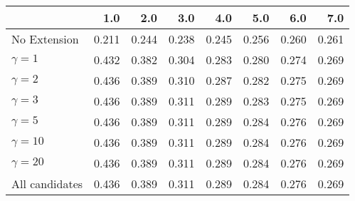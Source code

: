 \begin{tabular}{lrrrrrrr}
\toprule
{} &   1.0 &   2.0 &   3.0 &   4.0 &   5.0 &   6.0 &   7.0 \\
\midrule
No Extension   & 0.211 & 0.244 & 0.238 & 0.245 & 0.256 & 0.260 & 0.261 \\
$\gamma = 1$   & 0.432 & 0.382 & 0.304 & 0.283 & 0.280 & 0.274 & 0.269 \\
$\gamma = 2$   & 0.436 & 0.389 & 0.310 & 0.287 & 0.282 & 0.275 & 0.269 \\
$\gamma = 3$   & 0.436 & 0.389 & 0.311 & 0.289 & 0.283 & 0.275 & 0.269 \\
$\gamma = 5$   & 0.436 & 0.389 & 0.311 & 0.289 & 0.284 & 0.276 & 0.269 \\
$\gamma = 10$  & 0.436 & 0.389 & 0.311 & 0.289 & 0.284 & 0.276 & 0.269 \\
$\gamma = 20$  & 0.436 & 0.389 & 0.311 & 0.289 & 0.284 & 0.276 & 0.269 \\
All candidates & 0.436 & 0.389 & 0.311 & 0.289 & 0.284 & 0.276 & 0.269 \\
\bottomrule
\end{tabular}
